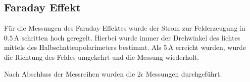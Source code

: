 \subsection{Faraday Effekt}
Für die Messungen des Faraday Effektes wurde der Strom zur Felderzeugung in $0.5\,$A schritten hoch geregelt. Hierbei wurde immer der Drehwinkel des lichtes mittels des Halbschattenpolarimeters bestimmt. Als $5\,$A erreicht wurden, wurde die Richtung des Feldes umgekehrt und die Messung wiederholt.\par
Nach Abschluss der Messreihen wurden die $2 \epsilon$ Messungen durchgeführt.